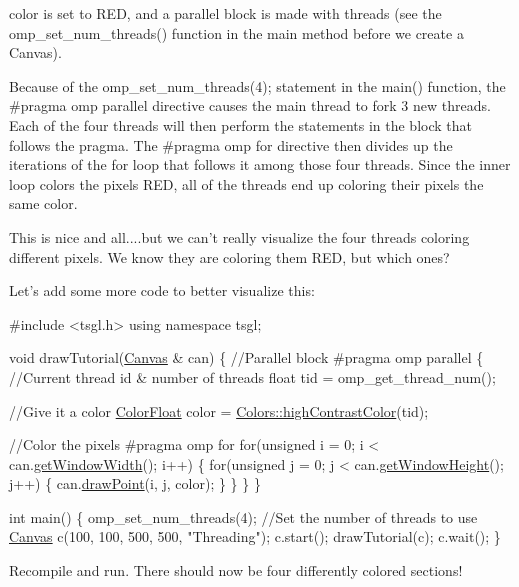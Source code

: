 {\ttfamily color} is set to {\ttfamily R\-E\-D}, and a parallel block is made with {} threads (see the {\ttfamily omp\-\_\-set\-\_\-num\-\_\-threads()} function in the main method before we create a Canvas).

Because of the {\ttfamily omp\-\_\-set\-\_\-num\-\_\-threads(4);} statement in the {\ttfamily main()} function, the {\ttfamily \#pragma omp parallel} directive causes the main thread to fork 3 new threads. Each of the four threads will then perform the statements in the block that follows the {\ttfamily pragma}. The {\ttfamily \#pragma omp for} directive then divides up the iterations of the {\ttfamily for} loop that follows it among those four threads. Since the inner loop colors the pixels {\ttfamily R\-E\-D}, all of the threads end up coloring their pixels the same color.

This is nice and all....but we can't really visualize the four threads coloring different pixels. We know they are coloring them {\ttfamily R\-E\-D}, but which ones?

Let's add some more code to better visualize this\-:


\begin{DoxyCode}
\textcolor{preprocessor}{#include <tsgl.h>}
\textcolor{keyword}{using namespace }tsgl;

\textcolor{keywordtype}{void} drawTutorial(\hyperlink{classtsgl_1_1_canvas}{Canvas} & can) \{
  \textcolor{comment}{//Parallel block}
\textcolor{preprocessor}{  #pragma omp parallel}
\textcolor{preprocessor}{}  \{
    \textcolor{comment}{//Current thread id & number of threads}
    \textcolor{keywordtype}{float} tid = omp\_get\_thread\_num();

    \textcolor{comment}{//Give it a color}
    \hyperlink{structtsgl_1_1_color_float}{ColorFloat} color = \hyperlink{classtsgl_1_1_colors_a93d3fc815542e586dbc1ecf3e984e0b6}{Colors::highContrastColor}(tid);

    \textcolor{comment}{//Color the pixels}
\textcolor{preprocessor}{    #pragma omp for}
\textcolor{preprocessor}{}    \textcolor{keywordflow}{for}(\textcolor{keywordtype}{unsigned} i = 0; i < can.\hyperlink{classtsgl_1_1_canvas_a086a0322f4a6ab27da6929b1aa0593af}{getWindowWidth}(); i++) \{
        \textcolor{keywordflow}{for}(\textcolor{keywordtype}{unsigned} j = 0; j < can.\hyperlink{classtsgl_1_1_canvas_ad740ebe5d6bd69ab79cde3e84f369f35}{getWindowHeight}(); j++) \{
            can.\hyperlink{classtsgl_1_1_canvas_a6c17c90cd13f7b0184a25e4acc2b7426}{drawPoint}(i, j, color);
          \}
    \}
  \}
\}

\textcolor{keywordtype}{int} main() \{
  omp\_set\_num\_threads(4);  \textcolor{comment}{//Set the number of threads to use}
  \hyperlink{classtsgl_1_1_canvas}{Canvas} c(100, 100, 500, 500, \textcolor{stringliteral}{"Threading"});
  c.start();
  drawTutorial(c);
  c.wait();
\}
\end{DoxyCode}
 Recompile and run. There should now be four differently colored sections!

